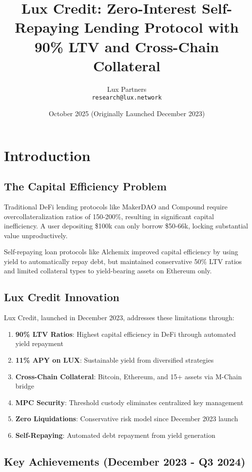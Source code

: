 \documentclass[11pt,a4paper]{article}
\title{Lux Credit: Zero-Interest Self-Repaying Lending Protocol with 90\% LTV and Cross-Chain Collateral}
\author{
Lux Partners\\
\texttt{research@lux.network}
}
\date{October 2025 (Originally Launched December 2023)}
\begin{document}
\maketitle

\section{Introduction}

\subsection{The Capital Efficiency Problem}

Traditional DeFi lending protocols like MakerDAO and Compound require overcollateralization ratios of 150-200\%, resulting in significant capital inefficiency. A user depositing \$100k can only borrow \$50-66k, locking substantial value unproductively.

Self-repaying loan protocols like Alchemix improved capital efficiency by using yield to automatically repay debt, but maintained conservative 50\% LTV ratios and limited collateral types to yield-bearing assets on Ethereum only.

\subsection{Lux Credit Innovation}

Lux Credit, launched in December 2023, addresses these limitations through:

\begin{enumerate}
\item \textbf{90\% LTV Ratios}: Highest capital efficiency in DeFi through automated yield repayment
\item \textbf{11\% APY on LUX}: Sustainable yield from diversified strategies
\item \textbf{Cross-Chain Collateral}: Bitcoin, Ethereum, and 15+ assets via M-Chain bridge
\item \textbf{MPC Security}: Threshold custody eliminates centralized key management
\item \textbf{Zero Liquidations}: Conservative risk model since December 2023 launch
\item \textbf{Self-Repaying}: Automated debt repayment from yield generation
\end{enumerate}

\subsection{Key Achievements (December 2023 - Q3 2024)}
\end{document}
